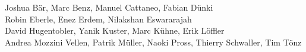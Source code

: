 %
%
%
Joshua Bär,			%
Marc Benz,			%
Manuel Cattaneo,		%
Fabian Dünki%
\\
Robin Eberle,			%
Enez Erdem,			%
Nilakshan Eswararajah%
\\
David Hugentobler,		%
Yanik Kuster,			%
Marc Kühne,			%
Erik Löffler%
\\
Andrea Mozzini Vellen,		%
Patrik Müller,			%
Naoki Pross,			%
Thierry Schwaller,		%
Tim Tönz			%

